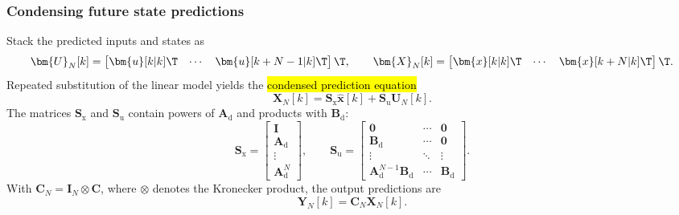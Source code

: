 \begin{frame}
	\frametitle{Condensing future state predictions}
	Stack the predicted inputs and states as
	\begin{equation}
		\bm{U}_{N}[k]=\begin{bmatrix}
			\bm{u}[k|k]\T & \cdots & \bm{u}[k+N-1|k]\T
		\end{bmatrix}\T,
		\qquad
		\bm{X}_{N}[k]=\begin{bmatrix}
			\bm{x}[k|k]\T & \cdots & \bm{x}[k+N|k]\T
		\end{bmatrix}\T.
	\end{equation}\pause%
	Repeated substitution of the linear model yields the \hl{condensed prediction equation}
	\begin{equation}
		\boxed{\bm{X}_{N}[k]=\bm{S}_{\mathrm{x}}\hat{\bm{x}}[k]+\bm{S}_{\mathrm{u}}\bm{U}_{N}[k].}
	\end{equation}\pause%
	The matrices $\bm{S}_{\mathrm{x}}$ and $\bm{S}_{\mathrm{u}}$ contain powers of $\bm{A}_{\mathrm{d}}$ and products with $\bm{B}_{\mathrm{d}}$:
	\begin{equation}
		\bm{S}_{\mathrm{x}}=\begin{bmatrix}\bm{I}\\ \bm{A}_{\mathrm{d}}\\ \vdots\\ \bm{A}_{\mathrm{d}}^{N}\end{bmatrix},
		\qquad
		\bm{S}_{\mathrm{u}}=\begin{bmatrix}
			\bm{0}                                       & \cdots & \bm{0}              \\
			\bm{B}_{\mathrm{d}}                          & \cdots & \bm{0}              \\
			\vdots                                       & \ddots & \vdots              \\
			\bm{A}_{\mathrm{d}}^{N-1}\bm{B}_{\mathrm{d}} & \cdots & \bm{B}_{\mathrm{d}}
		\end{bmatrix}.
	\end{equation}\pause%
	With $\bm{C}_{N}=\bm{I}_{N}\otimes \bm{C}$, where $\otimes$ denotes the Kronecker product, the output predictions are
	\begin{equation}
		\bm{Y}_{N}[k]=\bm{C}_{N}\bm{X}_{N}[k].
	\end{equation}
\end{frame}

